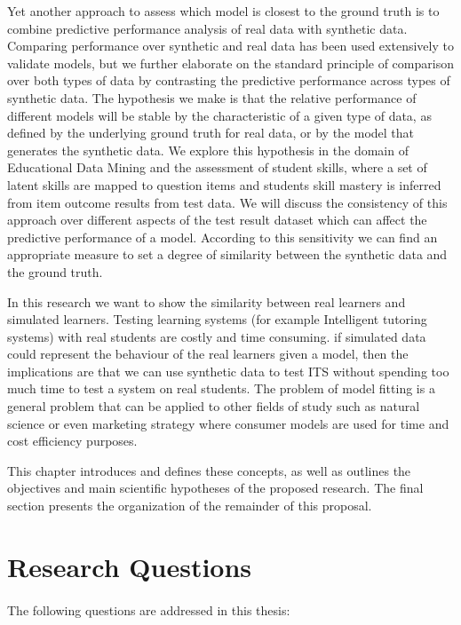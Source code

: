 Yet another approach to assess which model is closest to the ground truth is to combine predictive performance analysis of real data with synthetic data.  Comparing performance over synthetic and real data has been used extensively to validate models, but we further elaborate on the standard principle of comparison over both types of data by contrasting the predictive performance across types of synthetic data.  The hypothesis we make is that the relative performance of different models will be stable by the characteristic of a given type of data, as defined by the underlying ground truth for real data, or by the model that generates the synthetic data.  We explore this hypothesis in the domain of Educational Data Mining and the assessment of student skills, where a set of latent skills are mapped to question items and students skill mastery is inferred from item outcome results from test data. We will discuss the consistency of this approach over different aspects of the test result dataset which can affect the predictive performance of a model. According to this sensitivity we can find an appropriate measure to set a degree of similarity between the synthetic data and the ground truth.

In this research we want to show the similarity between real learners and simulated learners. Testing learning systems (for example Intelligent tutoring systems) with real students are costly and time consuming. if simulated data could represent the behaviour of the real learners given a model, then the implications are that we can use synthetic data to test ITS without spending too much time to test a system on real students. The problem of model fitting is a general problem that can be applied to other fields of study such as natural science or even marketing strategy where consumer models are used for time and cost efficiency purposes.



This chapter introduces and defines these concepts, as well as outlines the objectives and main scientific hypotheses of the proposed research. The final section presents the organization of the remainder of this proposal.


\section{Research Questions}
\paragraph{}The following questions are addressed in this thesis:

